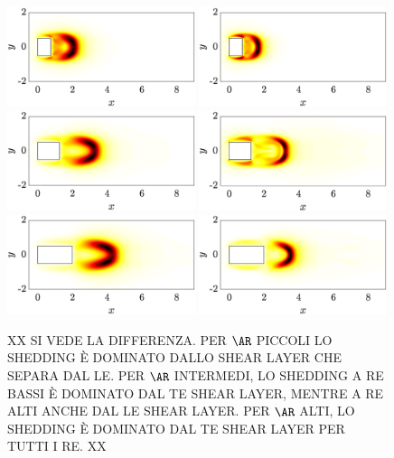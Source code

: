 \begin{figure}
  \centering
  \includegraphics[width=0.49\textwidth]{./fig/AR1s/sens_AR0p75_Re140.eps}
  \includegraphics[width=0.49\textwidth]{./fig/AR1s/sens_AR0p75_Re230.eps} 
  \includegraphics[width=0.49\textwidth]{./fig/AR1s/sens_AR1p25_Re140.eps}
  \includegraphics[width=0.49\textwidth]{./fig/AR1s/sens_AR1p25_Re230.eps}   
  \includegraphics[width=0.49\textwidth]{./fig/AR1s/sens_AR2_Re140.eps}
  \includegraphics[width=0.49\textwidth]{./fig/AR1s/sens_AR2_Re230.eps}  
  \caption{XX SI VEDE LA DIFFERENZA. PER $\AR$ PICCOLI LO SHEDDING È DOMINATO DALLO SHEAR LAYER CHE SEPARA DAL LE. PER $\AR$ INTERMEDI, LO SHEDDING A RE BASSI È DOMINATO DAL TE SHEAR LAYER, MENTRE A RE ALTI ANCHE DAL LE SHEAR LAYER. PER $\AR$ ALTI, LO SHEDDING È DOMINATO DAL TE SHEAR LAYER PER TUTTI I RE. XX}
  \label{fig:sens-short}
\end{figure}    
